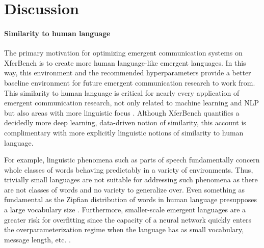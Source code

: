 \section{Discussion}
\unskip\label{hpo:sec:discussion}


\paragraph{Similarity to human language}
The primary motivation for optimizing emergent communication systems on XferBench is to create more human language-like emergent languages.
In this way, this environment and the recommended hyperparameters provide a better baseline environment for future emergent communication research to work from.
This similarity to human language is critical for nearly every application of emergent communication research, not only related to machine learning and NLP but also areas with more linguistic focus \citep{boldt2024review}.
Although XferBench quantifies a decidedly more deep learning, data-driven notion of similarity, this account is complimentary with more explicitly linguistic notions of similarity to human language.

For example, linguistic phenomena such as parts of speech fundamentally concern whole classes of words behaving predictably in a variety of environments.
Thus, trivially small languages are not suitable for addressing such phenomena as there are not classes of words and no variety to generalize over.
Even something as fundamental as the Zipfian distribution of words in human language presupposes a large vocabulary size \citep{zipf1949least,piantadosi2014zipf}.
Furthermore, smaller-scale emergent languages are a greater risk for overfitting since the capacity of a neural network quickly enters the overparameterization regime when the language has as small vocabulary, message length, etc. \citep{gupta-etal-2020-compositionality}.


